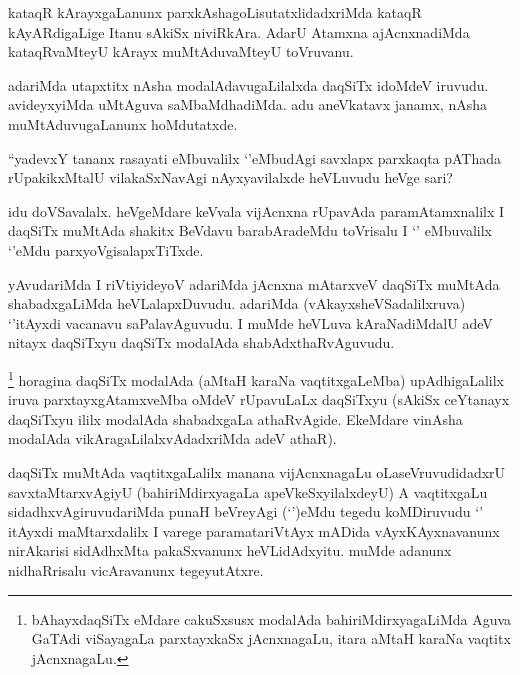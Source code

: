 \begin{artha}
kataqR kArayxgaLanunx parxkAshagoLisutatxlidadxriMda kataqR kAyARdigaLige Itanu sAkiSx niviRkAra. AdarU Atamxna ajAcnxnadiMda kataqRvaMteyU kArayx muMtAduvaMteyU toVruvanu.
\end{artha}

\begin{artha}
adariMda utapxtitx nAsha modalAdavugaLilalxda daqSiTx idoMdeV iruvudu. avideyxyiMda uMtAguva saMbaMdhadiMda. adu aneVkatavx janamx, nAsha muMtAduvugaLanunx hoMdutatxde.
\end{artha}


\begin{artha}
``yadevxY tananx rasayati eMbuvalilx `\stext'eMbudAgi savxlapx parxkaqta pAThada rUpakikxMtalU vilakaSxNavAgi nAyxyavilalxde heVLuvudu heVge sari?
\end{artha}

\begin{artha}
idu doVSavalalx. heVgeMdare keVvala vijAcnxna rUpavAda paramAtamxnalilx I daqSiTx muMtAda shakitx BeVdavu barabAradeMdu toVrisalu I `\stext' eMbuvalilx `\stext'eMdu parxyoVgisalapxTiTxde.
\end{artha}

\begin{artha}
yAvudariMda I riVtiyideyoV adariMda jAcnxna mAtarxveV daqSiTx muMtAda shabadxgaLiMda heVLalapxDuvudu. adariMda (vAkayxsheVSadalilxruva) `\stext'itAyxdi vacanavu saPalavAguvudu. I muMde heVLuva kAraNadiMdalU adeV nitayx daqSiTxyu daqSiTx modalAda shabAdxthaRvAguvudu.
\end{artha}

\begin{artha}
\footnote{bAhayxdaqSiTx eMdare cakuSxsusx modalAda bahiriMdirxyagaLiMda Aguva GaTAdi viSayagaLa parxtayxkaSx jAcnxnagaLu, itara aMtaH karaNa vaqtitx jAcnxnagaLu.}
horagina daqSiTx modalAda (aMtaH karaNa vaqtitxgaLeMba) upAdhigaLalilx iruva parxtayxgAtamxveMba oMdeV rUpavuLaLx daqSiTxyu (sAkiSx ceYtanayx daqSiTxyu ililx modalAda shabadxgaLa athaRvAgide. EkeMdare vinAsha modalAda vikAragaLilalxvAdadxriMda adeV athaR).
\end{artha}


\begin{artha}
daqSiTx muMtAda vaqtitxgaLalilx manana vijAcnxnagaLu oLaseVruvudidadxrU savxtaMtarxvAgiyU (bahiriMdirxyagaLa apeVkeSxyilalxdeyU) A vaqtitxgaLu sidadhxvAgiruvudariMda punaH beVreyAgi (`\stext')eMdu tegedu koMDiruvudu `\stext' itAyxdi maMtarxdalilx I varege paramatariVtAyx mADida vAyxKAyxnavanunx nirAkarisi sidAdhxMta pakaSxvanunx heVLidAdxyitu. muMde adanunx nidhaRrisalu vicAravanunx tegeyutAtxre. 
\end{artha}

